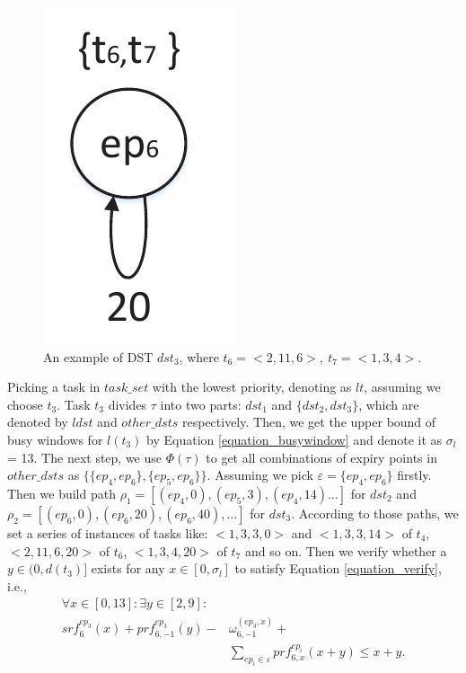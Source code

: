 \documentclass[10pt,conference]{IEEEtran}
\begin{document}
\begin{figure}
  \centering
  \includegraphics[scale=.5]{graphics/figure_dst3-eps-converted-to.pdf}
  \caption{An example of DST $dst_3$, where $t_6=<2,11,6>,\ t_7=<1,3,4>$.} 
  \label{figure_dst3}
\end{figure}

Picking a task in $task\_set$ with the lowest priority, denoting as $lt$, assuming we choose $t_3$. Task $t_3$ divides $\tau$ into two parts: $dst_1$ and $\{dst_2,dst_3\}$, which are denoted by $ldst$ and $other\_dsts$ respectively. Then, we get the upper bound of busy windows for $l(t_3)$ by Equation \ref{equation_busywindow} and denote it as $\sigma_l$ = 13. The next step, we use $\Phi(\tau)$ to get all combinations of expiry points in $other\_dsts$ as $\{\{ep_4,ep_6\},\{ep_5,ep_6\}\}$. Assuming we pick $\varepsilon=\{ep_4,ep_6\}$ firstly. Then we build path $\rho_1=[(ep_4,0),(ep_5,3),(ep_4,14)\dots]$ for $dst_2$ and $\rho_2=[(ep_6,0),(ep_6,20),(ep_6,40),\dots]$ for $dst_3$. According to those paths, we set a series of instances of tasks like: $<1,3,3,0>$ and $<1,3,3,14>$ of $t_4$, $<2,11,6,20>$ of $t_6$, $<1,3,4,20>$ of $t_7$ and so on. Then we verify whether a $y\in(0,d(t_3)]$ exists for any $x\in[0,\sigma_l]$ to satisfy Equation \ref{equation_verify}, i.e.,
\[\begin{split}
\forall x\in[0,13]:\exists y\in[2,9]:&
\\
srf^{ep_3}_6(x)+prf^{ep_3}_{6,-1}(y)-&\omega^{(ep_3,x)}_{6,-1}+
\\
&\sum\limits_{ep_i\in \varepsilon}prf^{ep_i}_{6,x}(x+y)\leq x+y.
\end{split}\]
\end{document}
